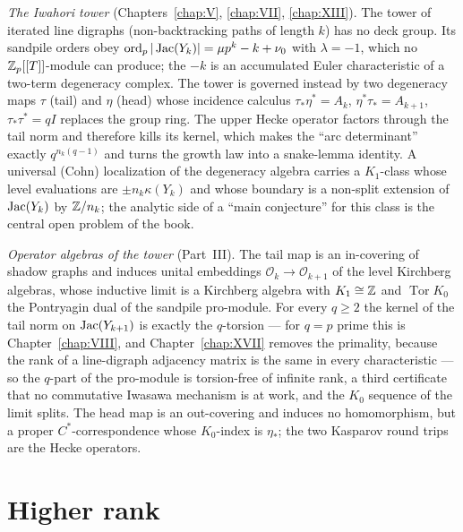 \emph{The Iwahori tower} (Chapters~\ref{chap:V}, \ref{chap:VII}, \ref{chap:XIII}). The
tower of iterated line digraphs (non-backtracking paths of length $k$) has no deck
group. Its sandpile orders obey $\operatorname{ord}_p|\operatorname{Jac}(Y_k)|=\mu p^k-k+\nu_0$ with
$\lambda=-1$, which no $\mathbb{Z}_p[[T]]$-module can produce; the $-k$ is an accumulated Euler
characteristic of a two-term degeneracy complex. The tower is governed instead by two
degeneracy maps $\tau$ (tail) and $\eta$ (head) whose incidence calculus
$\tau_*\eta^*=A_k$, $\eta^*\tau_*=A_{k+1}$, $\tau_*\tau^*=qI$ replaces the group ring.
The upper Hecke operator factors through the tail norm and therefore kills its kernel,
which makes the ``arc determinant'' exactly $q^{n_k(q-1)}$ and turns the growth law into
a snake-lemma identity. A universal (Cohn) localization of the degeneracy algebra carries
a $K_1$-class whose level evaluations are $\pm n_k\kappa(Y_k)$ and whose boundary is a
non-split extension of $\operatorname{Jac}(Y_k)$ by $\mathbb{Z}/n_k$; the analytic side of a ``main
conjecture'' for this class is the central open problem of the book.

\emph{Operator algebras of the tower} (Part~III). The tail map is an in-covering of
shadow graphs and induces unital embeddings $\mathcal O_k\to\mathcal O_{k+1}$ of the
level Kirchberg algebras, whose inductive limit is a Kirchberg algebra with
$K_1\cong\mathbb{Z}$ and $\operatorname{Tor}K_0$ the Pontryagin dual of the sandpile pro-module.
For every $q\ge2$ the kernel of the tail norm on $\operatorname{Jac}(Y_{k+1})$ is exactly the
$q$-torsion --- for $q=p$ prime this is Chapter~\ref{chap:VIII}, and
Chapter~\ref{chap:XVII} removes the primality, because the rank of a line-digraph
adjacency matrix is the same in every characteristic --- so the $q$-part of the pro-module
is torsion-free of infinite rank, a third certificate that no commutative Iwasawa
mechanism is at work, and the $K_0$ sequence of the limit splits. The head map is an
out-covering and induces no homomorphism, but a proper $C^*$-correspondence whose
$K_0$-index is $\eta_*$; the two Kasparov round trips are the Hecke operators.

\section{Higher rank}

